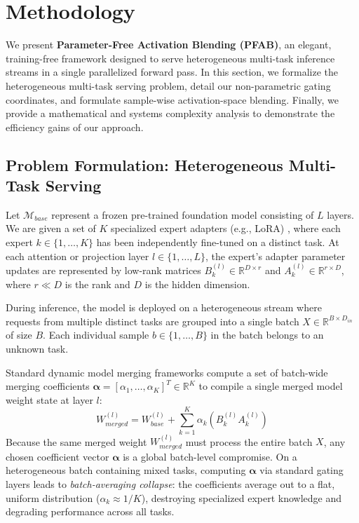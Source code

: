 \section{Methodology}
\label{sec:method}

We present \textbf{Parameter-Free Activation Blending (PFAB)}, an elegant, training-free framework designed to serve heterogeneous multi-task inference streams in a single parallelized forward pass. In this section, we formalize the heterogeneous multi-task serving problem, detail our non-parametric gating coordinates, and formulate sample-wise activation-space blending. Finally, we provide a mathematical and systems complexity analysis to demonstrate the efficiency gains of our approach.

\subsection{Problem Formulation: Heterogeneous Multi-Task Serving}
Let $\mathcal{M}_{base}$ represent a frozen pre-trained foundation model consisting of $L$ layers. We are given a set of $K$ specialized expert adapters (e.g., LoRA) \cite{hu2021lora}, where each expert $k \in \{1, \dots, K\}$ has been independently fine-tuned on a distinct task. At each attention or projection layer $l \in \{1, \dots, L\}$, the expert's adapter parameter updates are represented by low-rank matrices $B_k^{(l)} \in \mathbb{R}^{D \times r}$ and $A_k^{(l)} \in \mathbb{R}^{r \times D}$, where $r \ll D$ is the rank and $D$ is the hidden dimension.

During inference, the model is deployed on a heterogeneous stream where requests from multiple distinct tasks are grouped into a single batch $X \in \mathbb{R}^{B \times D_{in}}$ of size $B$. Each individual sample $b \in \{1, \dots, B\}$ in the batch belongs to an unknown task. 

Standard dynamic model merging frameworks compute a set of batch-wide merging coefficients $\boldsymbol{\alpha} = [\alpha_1, \dots, \alpha_K]^T \in \mathbb{R}^K$ to compile a single merged model weight state at layer $l$:
\begin{equation}
  W^{(l)}_{merged} = W^{(l)}_{base} + \sum_{k=1}^K \alpha_k \left( B_k^{(l)} A_k^{(l)} \right)
\end{equation}
Because the same merged weight $W^{(l)}_{merged}$ must process the entire batch $X$, any chosen coefficient vector $\boldsymbol{\alpha}$ is a global batch-level compromise. On a heterogeneous batch containing mixed tasks, computing $\boldsymbol{\alpha}$ via standard gating layers leads to \emph{batch-averaging collapse}: the coefficients average out to a flat, uniform distribution ($\alpha_k \approx 1/K$), destroying specialized expert knowledge and degrading performance across all tasks.

